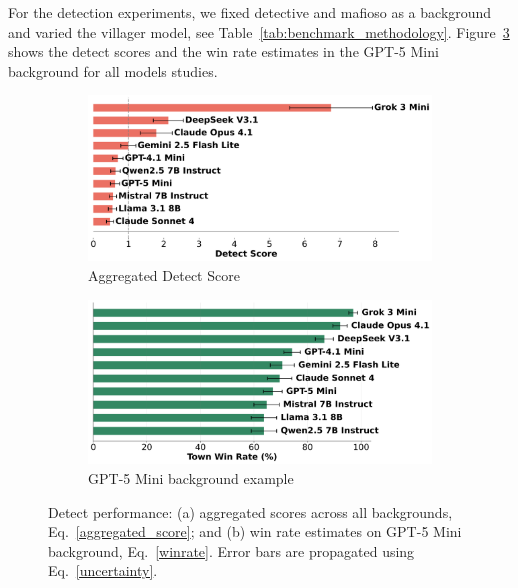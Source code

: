 \documentclass{article}
\begin{document}
For the detection experiments, we fixed detective and mafioso as a background and varied the villager model, see Table~\ref{tab:benchmark_methodology}. Figure~\ref{fig:detect_example} shows the detect scores and the win rate estimates in the GPT-5 Mini background for all models studies.

\begin{figure}[htbp]
    \centering
    \begin{subfigure}[b]{0.48\textwidth}
        \centering
        \includegraphics[width=\textwidth]{../results/villager_score_benchmark_exponential.png}
        \caption{Aggregated Detect Score}
        \label{fig:detect_score}
    \end{subfigure}
    \hfill
    \begin{subfigure}[b]{0.48\textwidth}
        \centering
        \includegraphics[width=\textwidth]{../results/villager_gpt-5_mini_db_benchmark.png}
        \caption{GPT-5 Mini background example}
        \label{fig:detect_gpt_example}
    \end{subfigure}
    \caption{Detect performance: (a) aggregated scores across all backgrounds, Eq.~\eqref{aggregated_score}; and (b) win rate estimates on GPT-5 Mini background, Eq.~\eqref{winrate}. Error bars are propagated using Eq.~\eqref{uncertainty}.}
    \label{fig:detect_example}
\end{figure}
\end{document}
